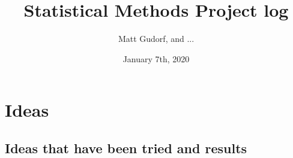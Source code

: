 \documentclass[letter,10pt,openany]{article}
\begin{document}
\title{Statistical Methods Project log}
\author{Matt Gudorf, and ...}
\date{January 7th, 2020} \Private{\date{\today}}

\maketitle

\section{Ideas}

\subsection{Ideas that have been tried and results}







%
\end{document}

